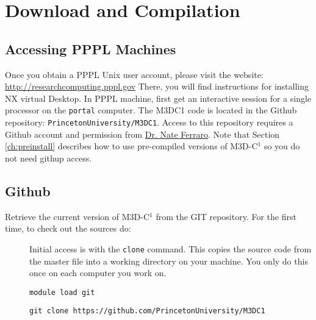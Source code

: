 \section{Download and Compilation}

\subsection{Accessing PPPL Machines}

Once you obtain a PPPL Unix user account, please visit the website:   
\newline\newline
\href{http://researchcomputing.pppl.gov}{http://researchcomputing.pppl.gov}
\newline\newline
There, you will find instructions for installing NX virtual Desktop.
\newline\newline
In PPPL machine, first get an interactive session for a single processor on the \texttt{portal} computer.    
The M3DC1 code is located in the Github repository: \texttt{PrincetonUniversity/M3DC1}. 
Access to this repository requires a Github account and permission from \href{mailto:nferraro@pppl.gov}{Dr. Nate Ferraro}. 
Note that Section \ref{ch:preinstall} describes how to use pre-compiled versions of M3D-C$^{1}$ so you do not need githup access.

\subsection{Github}

Retrieve the current version of M3D-C$^{1}$ from the GIT repository.  For the first time, to check out the sources do:
\begin{description}
\item[ ] Initial access is with the \texttt{clone} command.   This copies the source code from the master file into a working directory on your machine.   You only do this once on each computer you work on.
\item[ ] \texttt{module load git}
\item[ ] \texttt{git clone https://github.com/PrincetonUniversity/M3DC1}
\end{description}

